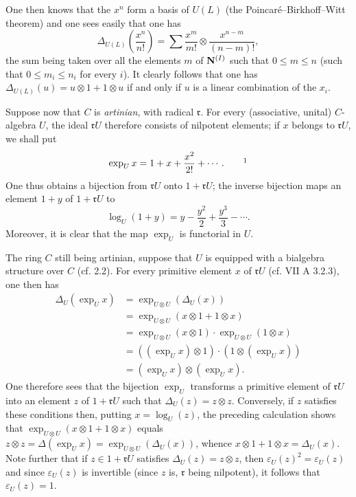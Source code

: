 One then knows that the $x^n$ form a basis of $U(L)$ (the Poincaré--Birkhoff--Witt theorem) and one sees easily that one has
\[
\Delta_{U(L)}\left(\frac{x^n}{n!}\right)=\sum\frac{x^m}{m!}\otimes\frac{x^{n-m}}{(n-m)!},\tag{*}
\]
the sum being taken over all the elements $m$ of $\mathbf{N}^{(I)}$ such that $0\le m\le n$ (\ie such that $0\le m_i\le n_i$ for every $i$). It clearly follows that one has $\Delta_{U(L)}(u)=u\otimes1+1\otimes u$ if and only if $u$ is a linear combination of the $x_i$.

Suppose now that $C$ is \emph{artinian}, with radical $\mathfrak r$. For every (associative, unital) $C$-algebra $U$, the ideal $\mathfrak rU$ therefore consists of nilpotent elements; if $x$ belongs to $\mathfrak rU$, we shall put
\[
\exp_Ux=1+x+\frac{x^2}{2!}+\cdots.\qquad\mbox{\footnotemark}
\]
One thus obtains a bijection from $\mathfrak rU$ onto $1+\mathfrak rU$; the inverse bijection maps an element $1+y$ of $1+\mathfrak rU$ to
\[
\log_U(1+y)=y-\frac{y^2}{2}+\frac{y^3}{3}-\cdots.
\]
Moreover, it is clear that the map $\exp_U$ is functorial in $U$.

The ring $C$ still being artinian, suppose that $U$ is equipped with a bialgebra structure over $C$ (cf. 2.2). For every primitive element $x$ of $\mathfrak rU$ (cf. VII A 3.2.3), one then has
\[
\begin{aligned}
\Delta_U(\exp_Ux)&=\exp_{U\otimes U}(\Delta_U(x))\\
&=\exp_{U\otimes U}(x\otimes1+1\otimes x)\\
&=\exp_{U\otimes U}(x\otimes1)\cdot\exp_{U\otimes U}(1\otimes x)\\
&=((\exp_Ux)\otimes1)\cdot(1\otimes(\exp_Ux))\\
&=(\exp_Ux)\otimes(\exp_Ux).
\end{aligned}
\]
One therefore sees that the bijection $\exp_U$ transforms a primitive element of $\mathfrak rU$ into an element $z$ of $1+\mathfrak rU$ such that $\Delta_U(z)=z\otimes z$. Conversely, if $z$ satisfies these conditions then, putting $x=\log_U(z)$, the preceding calculation shows that $\exp_{U\otimes U}(x\otimes1+1\otimes x)$ equals $z\otimes z=\Delta(\exp_Ux)=\exp_{U\otimes U}(\Delta_U(x))$, whence $x\otimes1+1\otimes x=\Delta_U(x)$. Note further that if $z\in1+\mathfrak rU$ satisfies $\Delta_U(z)=z\otimes z$, then $\varepsilon_U(z)^2=\varepsilon_U(z)$ and since $\varepsilon_U(z)$ is invertible (since $z$ is, $\mathfrak r$ being nilpotent), it follows that $\varepsilon_U(z)=1$.

